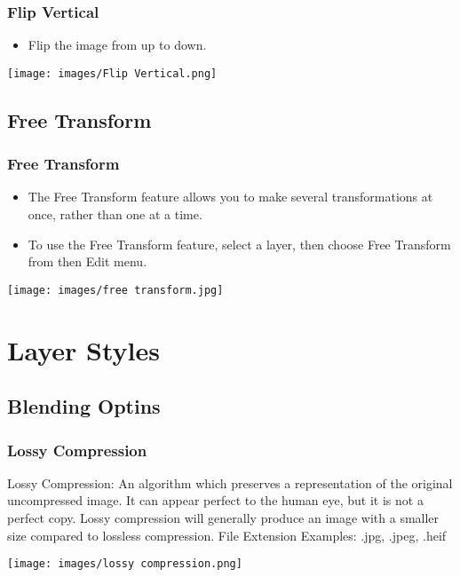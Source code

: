 \documentclass{beamer}
\begin{document}
\begin{frame}
	\frametitle{Flip Vertical}
\begin{itemize}
	\item Flip the image from up to down.
\end{itemize}
\begin{center}
	\texttt{[image: images/Flip Vertical.png]}
\end{center}
\end{frame}

		\subsection{Free Transform}
\begin{frame}
	\frametitle{Free Transform}
	\begin{itemize}
		\item The Free Transform feature allows you to make several transformations at once, rather than one at a time.
		\item To use the Free Transform feature, select a layer, then choose Free Transform from then Edit menu.
	\end{itemize}
	\begin{center}
		\texttt{[image: images/free transform.jpg]}
	\end{center}
\end{frame}


		
		
	\section{Layer Styles}
	
	\subsection{Blending Optins}

	\begin{frame}
		\frametitle{Lossy Compression}
		\begin{outline}
			\1 Lossy Compression:
			\2 An algorithm which preserves a representation of the original uncompressed image.  
			\2 It can appear perfect to the human eye, but it is not a perfect copy.  
			\2 Lossy compression will generally produce an image with a smaller size compared to lossless compression.  
			\1 File Extension Examples:  
			\2 .jpg, .jpeg, .heif
		\end{outline}
		\begin{center}
			\texttt{[image: images/lossy compression.png]}
		\end{center}
	\end{frame}
\end{document}
